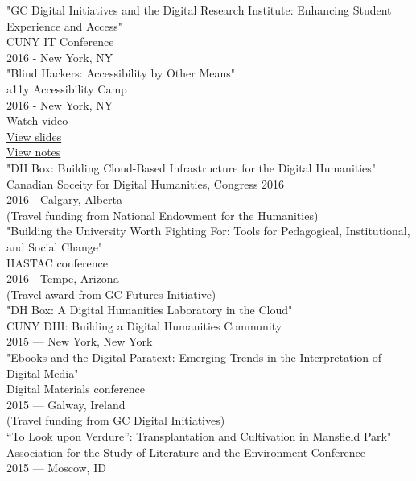 \documentclass[11pt]{article}
\begin{document}
"GC Digital Initiatives and the Digital Research Institute: Enhancing Student Experience and Access"\\
CUNY IT Conference\\
2016 - New York, NY\\

"Blind Hackers: Accessibility by Other Means"\\
a11y Accessibility Camp\\
2016 - New York, NY\\
\href{https://www.youtube.com/watch?v=W8_O3joo4aU}{Watch video}\\
\href{http://htmlpreview.github.io/?https://github.com/smythp/blind-hackers/blob/master/presentation/foo.html}{View slides}\\
\href{https://github.com/smythp/blind-hackers}{View notes}\\

"DH Box: Building Cloud-Based Infrastructure for the Digital Humanities"\\
Canadian Soceity for Digital Humanities, Congress 2016\\
2016 - Calgary, Alberta\\
(Travel funding from National Endowment for the Humanities)\\

"Building the University Worth Fighting For: Tools for Pedagogical, Institutional, and Social Change"\\
HASTAC conference\\
2016 - Tempe, Arizona\\
(Travel award from GC Futures Initiative)\\

"DH Box: A Digital Humanities Laboratory in the Cloud"\\
CUNY DHI: Building a Digital Humanities Community\\
2015 — New York, New York\\

"Ebooks and the Digital Paratext: Emerging Trends in the Interpretation of Digital Media"\\
Digital Materials conference\\
2015 — Galway, Ireland\\
(Travel funding from GC Digital Initiatives)\\

“To Look upon Verdure”: Transplantation and Cultivation in Mansfield Park"\\
Association for the Study of Literature and the Environment Conference\\
2015 — Moscow, ID\\
\end{document}
